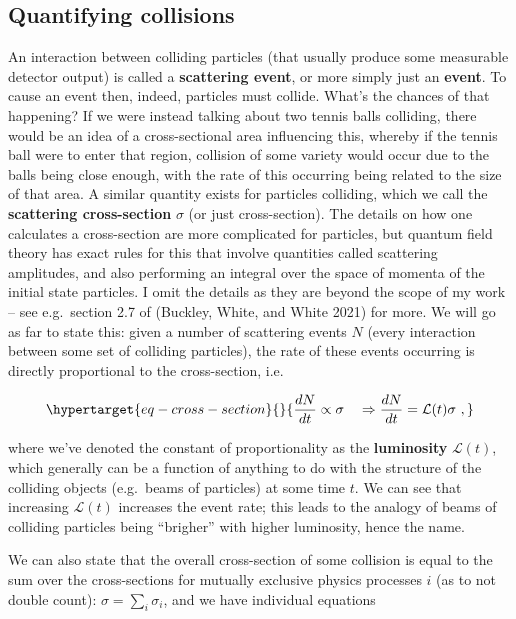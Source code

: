 \documentclass[
  11pt,
  numbers=noendperiod]{book}
\begin{document}
\hypertarget{quantifying-collisions}{%
\subsection{Quantifying collisions}\label{quantifying-collisions}}

An interaction between colliding particles (that usually produce some
measurable detector output) is called a \textbf{scattering event}, or
more simply just an \textbf{event}. To cause an event then, indeed,
particles must collide. What's the chances of that happening? If we were
instead talking about two tennis balls colliding, there would be an idea
of a cross-sectional area influencing this, whereby if the tennis ball
were to enter that region, collision of some variety would occur due to
the balls being close enough, with the rate of this occurring being
related to the size of that area. A similar quantity exists for
particles colliding, which we call the \textbf{scattering cross-section}
\(\sigma\) (or just cross-section). The details on how one calculates a
cross-section are more complicated for particles, but quantum field
theory has exact rules for this that involve quantities called
scattering amplitudes, and also performing an integral over the space of
momenta of the initial state particles. I omit the details as they are
beyond the scope of my work -- see e.g.~section 2.7 of (Buckley, White,
and White 2021) for more. We will go as far to state this: given a
number of scattering events \(N\) (every interaction between some set of
colliding particles), the rate of these events occurring is directly
proportional to the cross-section, i.e.

\begin{equation}\protect\hypertarget{eq-cross-section}{}{
\frac{dN}{dt} \propto \sigma~~~\Rightarrow \frac{dN}{dt} = \mathcal{L}(t) \sigma~,
}\label{eq-cross-section}\end{equation}

where we've denoted the constant of proportionality as the
\textbf{luminosity} \(\mathcal{L}(t)\), which generally can be a
function of anything to do with the structure of the colliding objects
(e.g.~beams of particles) at some time \(t\). We can see that increasing
\(\mathcal{L}(t)\) increases the event rate; this leads to the analogy
of beams of colliding particles being ``brigher'' with higher
luminosity, hence the name.

We can also state that the overall cross-section of some collision is
equal to the sum over the cross-sections for mutually exclusive physics
processes \(i\) (as to not double count): \(\sigma = \sum_i \sigma_i\),
and we have individual equations
\end{document}
